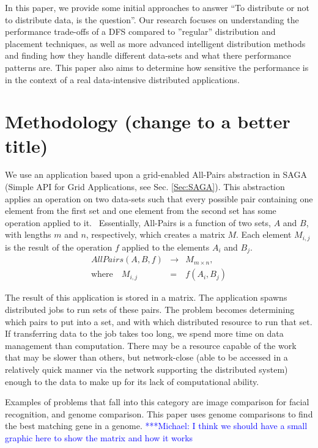 \documentclass{rspublic}
\newcommand{\micnote}[1]{ {\textcolor{blue} { ***Michael: #1 }}} \else
\begin{document}
In this paper, we provide some initial approaches to answer
 ``To distribute or not to distribute data, is the question''. 
 Our research focuses on understanding the performance trade-offs
  of a DFS compared to ''regular''
distribution and placement techniques, as well as more advanced
intelligent distribution methods and finding how
they handle different data-sets and what there performance patterns
are.  This paper also aims to determine
how sensitive the performance is in the context of a real data-intensive
distributed applications.

\section {Methodology (change to a better title)}
We use an application based upon a
grid-enabled All-Pairs abstraction in SAGA (Simple API for
Grid Applications, see Sec. \ref{Sec:SAGA}). This abstraction applies an operation on two
data-sets such that every possible pair containing one element from the
first set and one element from the second set has some operation
applied to it.~\citep{Interop, AllPairs}  Essentially, All-Pairs is a
function of two sets, $A$ and $B$, with lengths $m$ and $n$, respectively, which creates a matrix $M$. Each element $M_{i,j}$ is the
result of the operation $f$ applied to the elements $A_i$ and $B_j$.
\begin{eqnarray}
 AllPairs(A, B, f) & \rightarrow & M_{m\times n}, \\
\mbox{where} \quad M_{i,j} & = & f(A_{i},B_{j})
 \end{eqnarray}
 
The result of this application is stored in a matrix.  The
application spawns distributed jobs to run sets of these pairs.  The
problem becomes determining which pairs to put into a set, and with
which distributed resource to run that set.  If transferring data to the
job takes too long, we spend more time on data management than
computation.  There may be a resource capable of the work that may be
slower than others, but network-close (able to be accessed in a
relatively quick manner via the network supporting the distributed
system) enough to the data to make up for its lack of computational
ability. 

Examples of problems that
fall into this category are image comparison for facial recognition, and
genome comparison.  This paper uses genome comparisons to find the best
matching gene in a genome. \micnote{I think we should have a small
graphic here to show the matrix and how it works}
\end{document}
